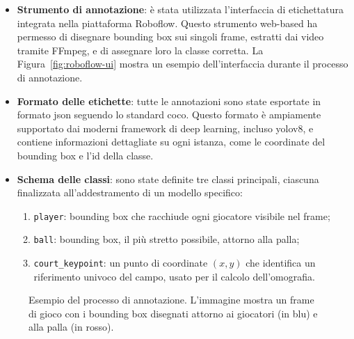 \documentclass[12pt,a4paper,openright,twoside]{book}
\begin{document}
\begin{itemize}
  \item \textbf{Strumento di annotazione}: è stata utilizzata l'interfaccia di etichettatura integrata nella piattaforma 
  Roboflow. Questo strumento web-based ha permesso di disegnare bounding box sui singoli frame, estratti dai video 
  tramite FFmpeg, e di assegnare loro la classe corretta.
  La Figura~\ref{fig:roboflow-ui} mostra un esempio dell'interfaccia durante il processo di annotazione.

  \item \textbf{Formato delle etichette}: tutte le annotazioni sono state esportate in formato \ac{json} seguendo lo 
  standard \ac{coco}. Questo formato è ampiamente supportato dai moderni framework di deep learning, incluso \ac{yolo}v8, 
  e contiene informazioni dettagliate su ogni istanza, come le coordinate del bounding box e l'\ac{id} della classe.


  \item \textbf{Schema delle classi}: sono state definite tre classi principali, ciascuna finalizzata all'addestramento 
  di un modello specifico:
    \begin{enumerate}
      \item \texttt{player}: bounding box che racchiude ogni giocatore visibile nel frame;
      \item \texttt{ball}: bounding box, il più stretto possibile, attorno alla palla;
      \item \texttt{court\_keypoint}: un punto di coordinate $(x,y)$ che identifica un riferimento univoco del campo, 
      usato per il calcolo dell'omografia.
    \end{enumerate}
\end{itemize}

\begin{figure}[h]
  \centering
  \caption{Esempio del processo di annotazione. L'immagine mostra un frame di gioco con i bounding box disegnati 
  attorno ai giocatori (in blu) e alla palla (in rosso).}
  \label{fig:annotazione}
\end{figure}
\end{document}
